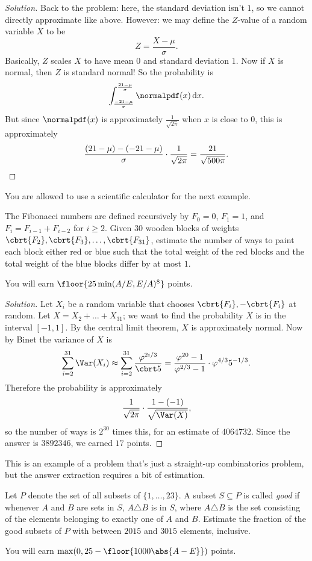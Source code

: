 \documentclass[11pt]{scrartcl}
\renewenvironment{solution}{\renewcommand\qedsymbol{$\blacksquare$}\begin{proof}[Solution]}{\end{proof}}
\begin{document}
\begin{solution}
	Back to the problem: here, the standard deviation isn't $1$, so we cannot directly approximate like above. However: we may define the $Z$-value of a random variable $X$ to be
	\[Z = \frac{X - \mu}{\sigma}.\]
	Basically, $Z$ scales $X$ to have mean $0$ and standard deviation $1$. Now if $X$ is normal, then $Z$ is standard normal! So the probability is
	\[\int_{\frac{-21 - \mu}{\sigma}}^{\frac{21 - \mu}{\sigma}}\normalpdf(x) \, \mathrm dx.\]
	But since $\normalpdf(x)$ is approximately $\frac1{\sqrt{2\pi}}$ when $x$ is close to $0$, this is approximately
	\[\frac{(21 - \mu) - (-21 - \mu)}{\sigma} \cdot \frac{1}{\sqrt{2\pi}} = \frac{21}{\sqrt{500\pi}}. \qedhere\]
\end{solution}

You are allowed to use a scientific calculator for the next example.

\begin{example}
	The Fibonacci numbers are defined recursively by $F_0 = 0$, $F_1 = 1$, and $F_i = F_{i - 1} + F_{i - 2}$ for $i \ge 2$. Given $30$ wooden blocks of weights $\cbrt{F_2},\cbrt{F_3},\dots,\cbrt{F_{31}}$, estimate the number of ways to paint each block either red or blue such that the total weight of the red blocks and the total weight of the blue blocks differ by at most $1$.

	You will earn $\floor{25\min(A/E,E/A)^8}$ points.
\end{example}

\begin{solution}
	Let $X_i$ be a random variable that chooses $\cbrt{F_i},-\cbrt{F_i}$ at random. Let $X = X_2 + \dots + X_{31}$; we want to find the probability $X$ is in the interval $[-1,1]$. By the central limit theorem, $X$ is approximately normal. Now by Binet the variance of $X$ is
	\[\sum_{i = 2}^{31}\Var(X_i) \approx \sum_{i = 2}^{31}\frac{\varphi^{2i/3}}{\cbrt 5} = \frac{\varphi^{20} - 1}{\varphi^{2/3} - 1} \cdot \varphi^{4/3}5^{-1/3}.\]
	Therefore the probability is approximately
	\[\frac1{\sqrt{2\pi}} \cdot \frac{1 - (-1)}{\sqrt{\Var(X)}},\]
	so the number of ways is $2^{30}$ times this, for an estimate of $4064732$. Since the answer is $3892346$, we earned $17$ points.
\end{solution}

This is an example of a problem that's just a straight-up combinatorics problem, but the answer extraction requires a bit of estimation.

\begin{example}
	Let $P$ denote the set of all subsets of $\{1,\dots,23\}$. A subset $S \subseteq P$ is called \emph{good} if whenever $A$ and $B$ are sets in $S$, $A \triangle B$ is in $S$, where $A \triangle B$ is the set consisting of the elements belonging to exactly one of $A$ and $B$. Estimate the fraction of the good subsets of $P$ with between $2015$ and $3015$ elements, inclusive.

	You will earn $\max(0,25 - \floor{1000\abs{A - E}})$ points.
\end{example}
\end{document}
